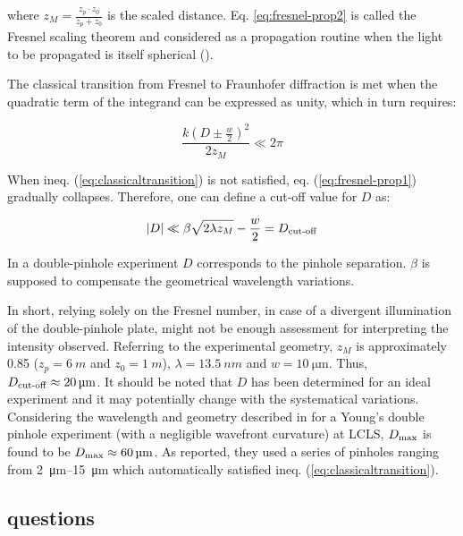 \documentclass{article}
\newcommand{\mathup}[1]{\text{\textup{#1}}}
\begin{document}
where $ z_M = \frac{z_p \cdot z_0}{z_p+z_0} $ is the scaled distance. Eq. \ref{eq:fresnel-prop2} is called the Fresnel scaling theorem and considered as a propagation routine when the light to be propagated is itself spherical (\cite[("Appendix B", pp. 397-400)]{Paganin2006}).

The classical transition from Fresnel to Fraunhofer diffraction is met when the quadratic term of the integrand can be expressed as unity, which in turn requires:

\begin{equation}\label{eq:classicaltransition}
	\frac{k \left( D \pm \frac{w}{2} \right)^2 }{2 z_M} \ll 2 \pi
\end{equation}

When ineq. (\ref*{eq:classicaltransition}) is not satisfied, eq. (\ref{eq:fresnel-prop1}) gradually collapses. Therefore, one can define a cut-off value for $ D $ as:

\begin{equation}\label{eq.cut-off}
	|D| \ll \beta \sqrt{2 \lambda z_M} - \frac{w}{2} = D_\mathup{cut-off}
\end{equation}

In a double-pinhole experiment $ D $ corresponds to the pinhole separation. $ \beta $ is supposed to compensate the geometrical wavelength variations.

In short, relying solely on the Fresnel number, in case of a divergent illumination of the double-pinhole plate, might not be enough assessment for interpreting the intensity observed. Referring to the experimental geometry, $ z_M $ is approximately 0.85 ($ z_p = \SI{6}{m} $ and $ z_0 = \SI{1}{m} $), $ \lambda = \SI{13.5}{nm} $ and $ w = \SI{10}{\micro\meter} $. Thus, $ D_\mathup{cut-off} \approx \SI{20}{\micro\meter} $. It should be noted that $ D $ has been determined for an ideal experiment and it may potentially change with the systematical variations. Considering the wavelength and geometry described in \cite{VartanyantsSingerMancusoEtAl2011} for a Young's double pinhole experiment (with a negligible wavefront curvature) at LCLS, $ D_\mathup{max} $ is found to be $ D_\mathup{max} \approx \SI{60}{\micro\meter} $. As reported, they used a series of pinholes ranging from \SIrange{2}{15}{\micro\meter} which automatically satisfied ineq. (\ref*{eq:classicaltransition}).



\subsection{questions}
\end{document}
